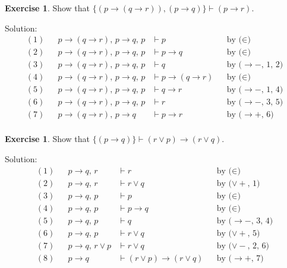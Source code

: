 \documentclass[11pt]{article}
\theoremstyle{definition}
\newtheorem{exercise}[thm]{Exercise}
\begin{document}
\begin{exercise}
Show that $\{(p \rightarrow (q \rightarrow r)), (p \rightarrow q)\} \vdash (p \rightarrow r)$.

Solution:
\begin{align*}
    (1) & & p \rightarrow (q \rightarrow r),\, p \rightarrow q,\, p  &\vdash p & & \text{by ($\in$)} \\
    (2) & & p \rightarrow (q \rightarrow r),\, p \rightarrow q,\, p  &\vdash p \rightarrow q & & \text{by ($\in$)} \\
    (3) & & p \rightarrow (q \rightarrow r),\, p \rightarrow q,\, p  &\vdash q & & \text{by ($\rightarrow-$, 1, 2)} \\
    (4) & & p \rightarrow (q \rightarrow r),\, p \rightarrow q,\, p  &\vdash p \rightarrow (q \rightarrow r) & & \text{by ($\in$)} \\
    (5) & & p \rightarrow (q \rightarrow r),\, p \rightarrow q,\, p  &\vdash q \rightarrow r & & \text{by ($\rightarrow-$, 1, 4)} \\
    (6) & & p \rightarrow (q \rightarrow r),\, p \rightarrow q,\, p  &\vdash r & & \text{by ($\rightarrow-$, 3, 5)} \\
    (7) & & p \rightarrow (q \rightarrow r),\, p \rightarrow q &\vdash p \rightarrow r & & \text{by ($\rightarrow+$, 6)} \\
\end{align*}
\end{exercise}

\begin{exercise}
Show that $\{(p \rightarrow q)\} \vdash (r \vee p) \rightarrow (r \vee q)$. 

Solution:
\begin{align*}
    (1) & & p \rightarrow q,\, r &\vdash r & & \text{by ($\in$)} \\
    (2) & & p \rightarrow q,\, r &\vdash r \vee q & & \text{by ($\vee+$, 1)} \\
    (3) & & p \rightarrow q,\, p &\vdash p & & \text{by ($\in$)} \\
    (4) & & p \rightarrow q,\, p &\vdash p \rightarrow q & & \text{by ($\in$)} \\
    (5) & & p \rightarrow q,\, p &\vdash q & & \text{by ($\rightarrow-$, 3, 4)} \\
    (6) & & p \rightarrow q,\, p &\vdash r \vee q & & \text{by ($\vee+$, 5)} \\
    (7) & & p \rightarrow q,\, r \vee p &\vdash r \vee q & & \text{by ($\vee-$, 2, 6)} \\
    (8) & & p \rightarrow q &\vdash (r \vee p) \rightarrow (r \vee q) & & \text{by ($\rightarrow+$, 7)} 
\end{align*}
\end{exercise}
\end{document}
